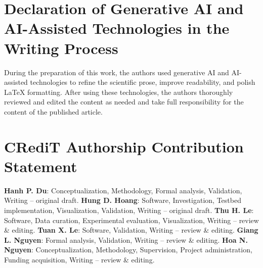 \documentclass[final,5p]{elsarticle}
\begin{document}
\section*{Declaration of Generative AI and AI-Assisted Technologies in the Writing Process}
During the preparation of this work, the authors used generative AI and AI-assisted technologies to refine the scientific prose, improve readability, and polish LaTeX formatting. After using these technologies, the authors thoroughly reviewed and edited the content as needed and take full responsibility for the content of the published article.

\section*{CRediT Authorship Contribution Statement}
\textbf{Hanh P. Du}: Conceptualization, Methodology, Formal analysis, Validation, Writing -- original draft.
\textbf{Hung D. Hoang}: Software, Investigation, Testbed implementation, Visualization, Validation, Writing -- original draft.
\textbf{Thu H. Le}: Software, Data curation, Experimental evaluation, Visualization, Writing -- review \& editing.
\textbf{Tuan X. Le}: Software, Validation, Writing -- review \& editing.
\textbf{Giang L. Nguyen}: Formal analysis, Validation, Writing -- review \& editing.
\textbf{Hoa N. Nguyen}: Conceptualization, Methodology, Supervision, Project administration, Funding acquisition, Writing -- review \& editing.



\end{document}

